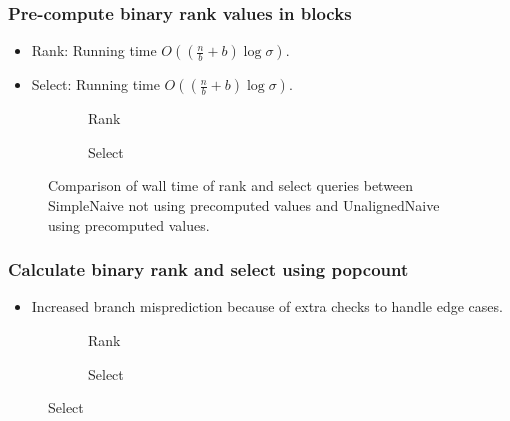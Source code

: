 \documentclass{beamer}
\begin{document}
\begin{frame}
\frametitle{Pre-compute binary rank values in blocks}
\begin{itemize}
\item Rank: Running time $O((\frac{n}{b} + b) \log \sigma)$.
\item Select: Running time $O((\frac{n}{b} + b) \log \sigma)$.
\end{itemize}
\begin{figure}
	\begin{subfigure}{0.48\textwidth}
		\begin{tiny}
		\scalebox{.7}{}
		\end{tiny}
		\caption{Rank}
	\end{subfigure}
	\hfill
	\begin{subfigure}{0.48\textwidth}
		\begin{tiny}
		\scalebox{.7}{}
		\end{tiny}
		\caption{Select}
	\end{subfigure}
	\caption{Comparison of wall time of rank and select queries between SimpleNaive not using precomputed values and UnalignedNaive using precomputed values.}
\end{figure}
\end{frame}

\begin{frame}
\frametitle{Calculate binary rank and select using popcount}
\begin{itemize}
\item Increased branch misprediction because of extra checks to handle edge cases.
\end{itemize}
\begin{figure}[h!]\tiny
	\begin{subfigure}{\textwidth}
		\center \scalebox{.6}{}
		\caption{\tiny{Rank}}
	\end{subfigure}
	\begin{subfigure}{\textwidth}
		\center \scalebox{.6}{}
		\caption{\tiny{Select}}
	\end{subfigure}
\end{figure}
\end{frame}
\end{document}
